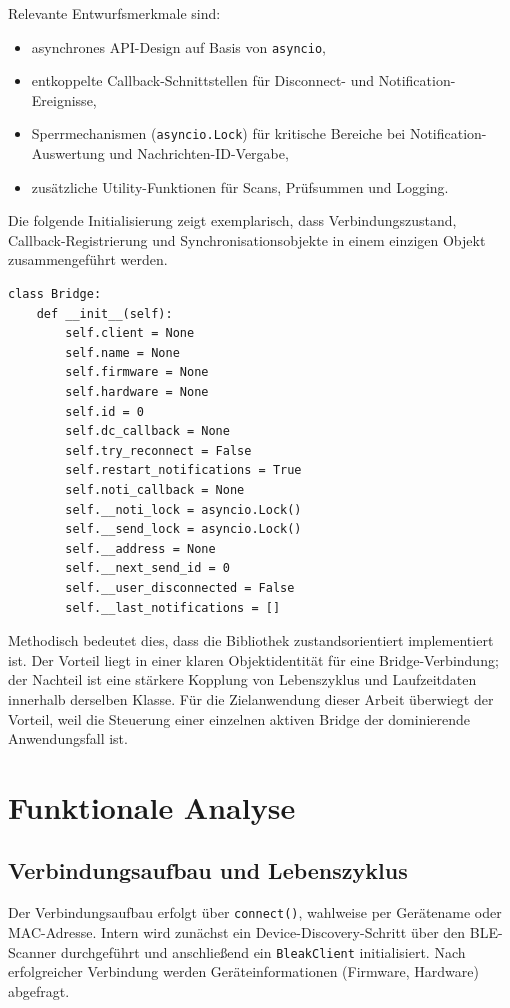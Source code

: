 Relevante Entwurfsmerkmale sind:
\begin{itemize}
	\item asynchrones API-Design auf Basis von \texttt{asyncio},
	\item entkoppelte Callback-Schnittstellen für Disconnect- und Notification-Ereignisse,
	\item Sperrmechanismen (\texttt{asyncio.Lock}) für kritische Bereiche bei Notification-Auswertung und Nachrichten-ID-Vergabe,
	\item zusätzliche Utility-Funktionen für Scans, Prüfsummen und Logging.
\end{itemize}

Die folgende Initialisierung zeigt exemplarisch, dass Verbindungszustand, Callback-Registrierung und Synchronisationsobjekte in einem einzigen Objekt zusammengeführt werden.

\begin{listing}[ht]
\caption{Auszug: Zustandsinitialisierung der \texttt{Bridge}-Klasse}
\label{lst:bridge-init}
\begin{verbatim}
class Bridge:
	def __init__(self):
		self.client = None
		self.name = None
		self.firmware = None
		self.hardware = None
		self.id = 0
		self.dc_callback = None
		self.try_reconnect = False
		self.restart_notifications = True
		self.noti_callback = None
		self.__noti_lock = asyncio.Lock()
		self.__send_lock = asyncio.Lock()
		self.__address = None
		self.__next_send_id = 0
		self.__user_disconnected = False
		self.__last_notifications = []
\end{verbatim}
\end{listing}

Methodisch bedeutet dies, dass die Bibliothek zustandsorientiert implementiert ist.
Der Vorteil liegt in einer klaren Objektidentität für eine Bridge-Verbindung; der Nachteil ist eine stärkere Kopplung von Lebenszyklus und Laufzeitdaten innerhalb derselben Klasse.
Für die Zielanwendung dieser Arbeit überwiegt der Vorteil, weil die Steuerung einer einzelnen aktiven Bridge der dominierende Anwendungsfall ist.

\section{Funktionale Analyse}
\subsection{Verbindungsaufbau und Lebenszyklus}
Der Verbindungsaufbau erfolgt über \texttt{connect()}, wahlweise per Gerätename oder MAC-Adresse.
Intern wird zunächst ein Device-Discovery-Schritt über den BLE-Scanner durchgeführt und anschließend ein \texttt{BleakClient} initialisiert.
Nach erfolgreicher Verbindung werden Geräteinformationen (Firmware, Hardware) abgefragt.

